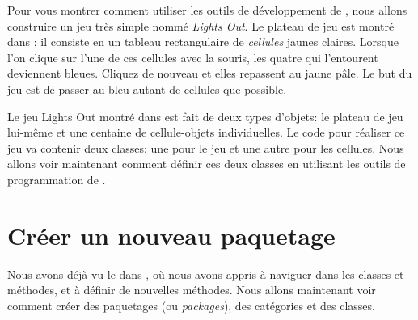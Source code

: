 \documentclass[a4paper,10pt,twoside]{book}
\begin{document}
Pour vous montrer comment utiliser les outils de développement de
\pharo, nous allons construire un jeu très simple nommé
\emph{Lights Out}.  Le plateau de jeu est montré dans
; il consiste en un tableau rectangulaire de
\emph{cellules} jaunes claires.  Lorsque l'on clique sur l'une de ces
cellules avec la souris, les quatre qui l'entourent deviennent
bleues. Cliquez de nouveau et elles repassent au jaune pâle. Le but du 
jeu est de passer au bleu autant de cellules que possible.

Le jeu Lights Out montré dans  est fait de deux types d'objets: le plateau de jeu lui-même et une centaine de cellule-objets individuelles. Le code \pharo pour réaliser ce jeu va contenir deux classes: une pour le jeu et une autre pour les cellules.
Nous allons voir maintenant comment définir ces deux classes en utilisant les outils de programmation de \pharo.

\section{Créer un nouveau paquetage}

Nous avons déjà vu le 
dans , où nous avons appris à naviguer dans les classes
et méthodes, et à définir de nouvelles méthodes.
Nous allons maintenant voir comment créer des paquetages (ou \emph{packages}), des catégories et des classes.

\end{document}
